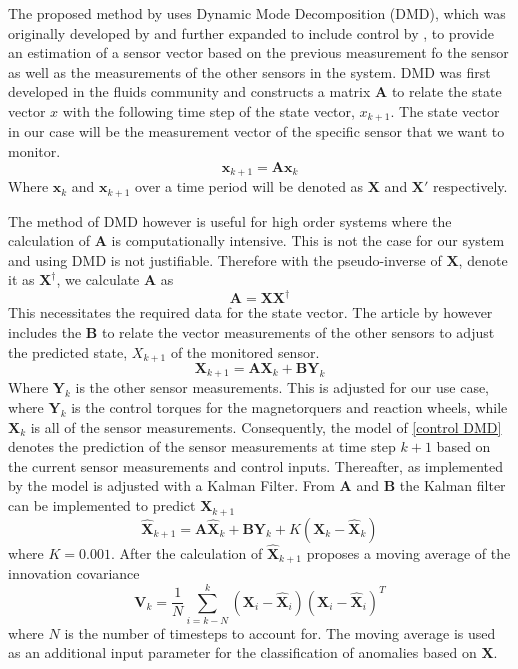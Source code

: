 \documentclass[letterpaper, 10 pt, conference]{ieeeconf}  %
\begin{document}
The proposed method by \textcite{DeSilva2020} uses Dynamic Mode Decomposition (DMD), which was originally developed by \textcite{schmid2011applications} and further expanded to include control by \textcite{proctor2016dynamic}, to provide an estimation of a sensor vector based on the previous measurement fo the sensor as well as the measurements of the other sensors in the system. DMD was first developed in the fluids community and constructs a matrix $\mathbf{A}$ to relate the state vector $x$ with the following time step of the state vector, $x_{k+1}$. The state vector in our case will be the measurement vector of the specific sensor that we want to monitor.
\begin{equation}
	\mathbf{x}_{k+1} = \mathbf{Ax}_k
\end{equation}
Where $\mathbf{x}_k$ and $\mathbf{x}_{k+1}$ over a time period will be denoted as $\mathbf{X}$ and $\mathbf{X'}$ respectively.

The method of DMD however is useful for high order systems where the calculation of $\mathbf{A}$ is computationally intensive. This is not the case for our system and using DMD is not justifiable. Therefore with the pseudo-inverse of $\mathbf{X}$, denote it as $\mathbf{X^{\dagger}}$, we calculate $\mathbf{A}$ as
\begin{equation}
	\mathbf{A} = \mathbf{X}\mathbf{X^{\dagger}}
\end{equation}
This necessitates the required data for the state vector. The article by \textcite{DeSilva2020} however includes the $\mathbf{B}$ to relate the vector measurements of the other sensors to adjust the predicted state, $X_{k+1}$ of the monitored sensor. 
\begin{equation}
	\mathbf{X}_{k+1} = \mathbf{AX}_k + \mathbf{BY}_k
	\label{control DMD}
\end{equation}
Where $\mathbf{Y}_k$ is the other sensor measurements. This is adjusted for our use case, where $\mathbf{Y}_k$ is the control torques for the magnetorquers and reaction wheels, while $\mathbf{X}_k$ is all of the sensor measurements. Consequently, the model of \ref{control DMD} denotes the prediction of the sensor measurements at time step $k+1$ based on the current sensor measurements and control inputs.
Thereafter, as implemented by \textcite{DeSilva2020} the model is adjusted with a Kalman Filter. From $\mathbf{A}$ and $\mathbf{B}$ the Kalman filter can be implemented to predict $\mathbf{X}_{k+1}$
\begin{equation}
	\hat{\mathbf{X}}_{k+1} = \mathbf{A}\hat{\mathbf{X}}_k + \mathbf{B}\mathbf{Y}_k + K(\mathbf{X}_k - \hat{\mathbf{X}}_k)
\end{equation}
where $K = 0.001$. After the calculation of $\hat{\mathbf{X}}_{k+1}$ \textcite{DeSilva2020} proposes a moving average of the innovation covariance
\begin{equation}
	\mathbf{V}_k = \frac{1}{N} \sum_{i=k-N}^k (\mathbf{X}_i - \hat{\mathbf{X}}_i)(\mathbf{X}_i - \hat{\mathbf{X}}_i)^T
\end{equation}
where $N$ is the number of timesteps to account for. The moving average is used as an additional input parameter for the classification of anomalies based on $\mathbf{X}$.
\end{document}
